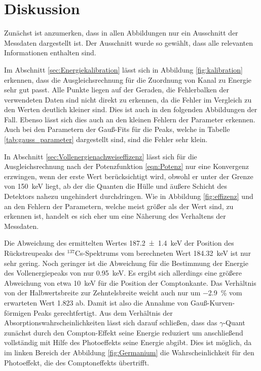 \section{Diskussion}
\label{sec:Diskussion}
Zunächst ist anzumerken, dass in allen Abbildungen nur ein Ausschnitt
der Messdaten dargestellt ist. Der Ausschnitt wurde so gewählt, dass alle
relevanten Informationen enthalten sind.

Im Abschnitt \ref{sec:Energiekalibration} lässt sich in Abbildung \ref{fig:kalibration}
erkennen, dass die Ausgleichsrechnung für die Zuordnung von Kanal zu Energie
sehr gut passt. Alle Punkte liegen auf der Geraden, die Fehlerbalken der
verwendeten Daten sind nicht direkt zu erkennen, da die Fehler im Vergleich zu
den Werten deutlich kleiner sind. Dies ist auch in den folgenden Abbildungen
der Fall. Ebenso lässt sich dies auch an den kleinen Fehlern der Parameter erkennen.
Auch bei den Parametern der Gauß-Fits für die Peaks, welche in Tabelle
\ref{tab:gauss_parameter} dargestellt sind, sind die Fehler sehr klein.

In Abschnitt \ref{sec:Vollenergienachweiseffizenz} lässt sich für die Ausgleichsrechnung nach
der Potenzfunktion \ref{eqn:Potenz} nur eine Konvergenz erzwingen, wenn der erste Wert
berücksichtigt wird, obwohl er unter der Grenze von \SI{150}{\kilo\electronvolt}
liegt, ab der die Quanten die Hülle und äußere Schicht des Detektors nahezu ungehindert 
durchdringen. Wie in Abbildung \ref{fig:effizenz} und an den Fehlern der 
Parametern, welche meist größer als der Wert sind, zu erkennen ist, handelt es sich
eher um eine Näherung des Verhaltens der Messdaten.

Die Abweichung des ermittelten Wertes \SI{187.2(14)}{\kilo\electronvolt} der
Position des Rückstreupeaks des ${}^{137}$Cs-Spektrums vom
berechneten Wert \SI{184.32}{\kilo\electronvolt} ist nur sehr gering. Noch
geringer ist die Abweichung für die Bestimmung der Energie des Vollenergiepeaks
von nur \SI{0.95}{\kilo\electronvolt}. Es ergibt sich allerdings eine
größere Abweichung von etwa \SI{10}{\kilo\electronvolt} für die Position
der Comptonkante.
Das Verhältnis von der Halbwertsbreite zur Zehntelsbreite weicht auch nur 
um \SI{-2.9}{\percent} vom erwarteten Wert \num{1.823} ab. Damit ist
also die Annahme von Gauß-Kurven-förmigen Peaks gerechtfertigt.
Aus dem Verhältnis der Absorptionswahrscheinlichkeiten lässt sich darauf schließen,
dass das $\gamma$-Quant zunächst durch den Compton-Effekt seine Energie reduziert
um anschließend vollständig mit Hilfe des Photoeffekts seine Energie abgibt.
Dies ist möglich, da im linken Bereich der Abbildung \ref{fig:Germanium}
die Wahrscheinlichkeit für den Photoeffekt, die des Comptoneffekts
übertrifft.

